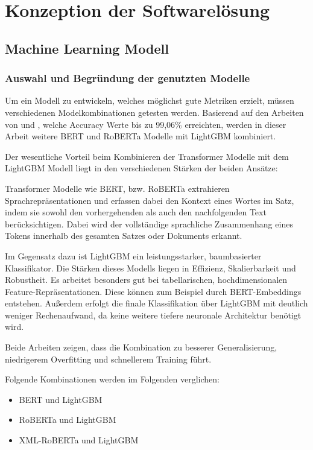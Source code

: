 \chapter{Konzeption der Softwarelösung}
\label{chap:konzeption_der_softwareloesung}

\section{Machine Learning Modell} \label{sec:06:machine_learning_model}

\subsection{Auswahl und Begründung der genutzten Modelle} 

Um ein Modell zu entwickeln, welches möglichst gute Metriken erzielt, müssen verschiedenen Modelkombinationen getesten werden.
Basierend auf den Arbeiten von \cite{Essa:2023aa} und \cite{V_G_2024}, welche Accuracy Werte bis zu 99,06\% erreichten, werden in dieser Arbeit weitere BERT und RoBERTa
Modelle mit LightGBM kombiniert.

Der wesentliche Vorteil beim Kombinieren der Transformer Modelle mit dem LightGBM Modell liegt in den verschiedenen Stärken der beiden Ansätze:

Transformer Modelle wie BERT, bzw. RoBERTa extrahieren Sprachrepräsentationen und erfassen dabei den Kontext
eines Wortes im Satz, indem sie sowohl den vorhergehenden als auch den nachfolgenden Text berücksichtigen.
Dabei wird der vollständige sprachliche Zusammenhang eines Tokens innerhalb des gesamten Satzes oder Dokuments erkannt.

Im Gegensatz dazu ist LightGBM ein leistungsstarker, baumbasierter Klassifikator. Die Stärken dieses Modells liegen in Effizienz, Skalierbarkeit und Robustheit.
Es arbeitet besonders gut bei tabellarischen, hochdimensionalen Feature-Repräsentationen. 
Diese können zum Beispiel durch BERT-Embeddings entstehen.
Außerdem erfolgt die finale Klassifikation über LightGBM mit deutlich weniger Rechenaufwand, da keine weitere tiefere neuronale Architektur benötigt wird.

Beide Arbeiten zeigen, dass die Kombination zu besserer Generalisierung, niedrigerem Overfitting und schnellerem Training führt.

Folgende Kombinationen werden im Folgenden verglichen:
\begin{itemize}
    \item BERT und LightGBM
    \item RoBERTa und LightGBM
    \item XML-RoBERTa und LightGBM
\end{itemize}

